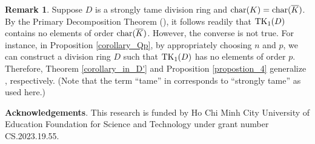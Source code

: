 \documentclass{amsart}
\theoremstyle{definition}
\newtheorem{remark}{Remark}
\numberwithin{equation}{section} %
\begin{document}
\begin{remark}
	Suppose $D$ is a strongly tame division ring and ${\rm char}(K) = {\rm char}(\overline{K})$. By the Primary Decomposition Theorem (\cite[Theorem 5]{motiee-13}), it follows readily that ${\rm TK}_1(D)$ contains no elements of order ${\rm char}(\overline{K})$. However, the converse is not true. For instance, in Proposition \ref{corollary_Qp}, by appropriately choosing $n$ and $p$, we can construct a division ring $D$ such that ${\rm TK}_1(D)$ has no elements of order $p$. Therefore, Theorem \ref{corollary_in_D'} and Proposition \ref{propostion_4} generalize \cite[Theorems 9 and 10]{motiee-13}, respectively. (Note that the term ``tame'' in \cite[Theorem 9]{motiee-13} corresponds to ``strongly tame'' as used here.)
\end{remark}

{\noindent \textbf{Acknowledgements}. This research is funded by Ho Chi Minh City University of Education Foundation for Science and Technology under grant number CS.2023.19.55}.
\end{document}
